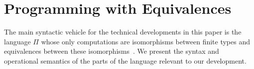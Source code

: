 \section{Programming with Equivalences}
\label{sec:pi}

The main syntactic vehicle for the technical developments in this
paper is the language $\Pi$ whose only computations are isomorphisms
between finite types and equivalences between these
isomorphisms~\cite{James:2012:IE:2103656.2103667,Carette2016}. We
present the syntax and operational semantics of the parts of the
language relevant to our development.

